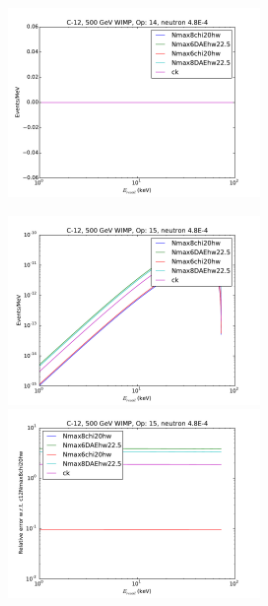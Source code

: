 \documentclass{article}
\begin{document}
\includegraphics[width=0.5\textwidth]{c12-o14}

\includegraphics[width=0.5\textwidth]{c12-o15}
\includegraphics[width=0.5\textwidth]{c12-o15-relerr}
\end{document}
